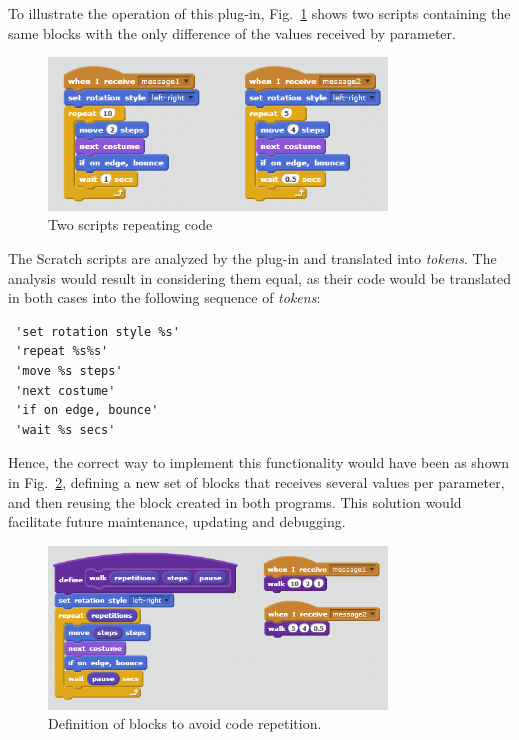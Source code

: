 \documentclass[conference]{format/IEEEtran}
\begin{document}
\begin{enumerate}
  To illustrate the operation of this plug-in, Fig.~\ref{fig:CodeRepetition1} shows two scripts containing the same blocks with the only difference of the values received by parameter.


\begin{figure}
  \centering
    \includegraphics[width=9cm]{img/CodeRepetition1.png}
  \caption{Two scripts repeating code}
  \label{fig:CodeRepetition1}
\end{figure}


The Scratch scripts are analyzed by the plug-in and translated into \textit{tokens}. The analysis would result in considering them equal, as their code would be translated in both cases into the following sequence of \textit{tokens}:
\begin{verbatim}
 'set rotation style %s'
 'repeat %s%s'
 'move %s steps'
 'next costume'
 'if on edge, bounce'
 'wait %s secs'
\end{verbatim}

Hence, the correct way to implement this functionality would have been as shown in Fig.~\ref{fig:CodeRepetition2}, defining a new set of blocks that receives several values per parameter, and then reusing the block created in both programs. This solution would facilitate future maintenance, updating and debugging.

\begin{figure}
  \centering
    \includegraphics[width=9cm]{img/CodeRepetition2.png}
  \caption{Definition of blocks to avoid code repetition.}
  \label{fig:CodeRepetition2}
\end{figure}

\end{enumerate}
\end{document}

